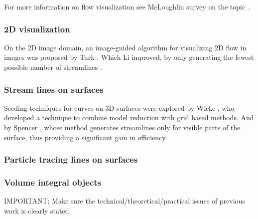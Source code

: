 For more information on flow visualization see McLoughlin survey on the topic~\cite{McLoughlin2010}.

\subsubsection{2D visualization}

On the 2D image domain, an image-guided algorithm for visualizing 2D flow in images was proposed by Turk \cite{Turk1996}.
Which Li improved, by only generating the fewest possible number of streamlines \cite{Li2008}. 

\subsubsection{Stream lines on surfaces}

Seeding techniques for curves on 3D surfaces were explored by Wicke \cite{Wicke2009}, who developed a technique to combine model reduction with grid based methods.
And by Spencer \cite{Spencer2009}, whose method generates streamlines only for visible parts of the surface, thus providing a significant gain in efficiency.

\subsubsection{Particle tracing lines on surfaces}

\subsubsection{Volume integral objects}


IMPORTANT: Make sure the technical/theoretical/practical issues of previous work is clearly stated 